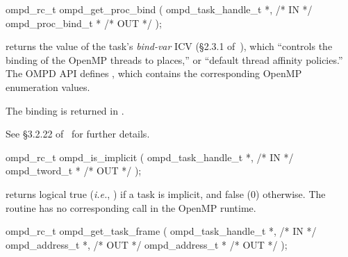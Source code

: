 \crossreferences


%
\summary

\format
\ccppspecificstart
\begin{boxedcode}
ompd\_rc\_t ompd\_get\_proc\_bind (
  ompd\_task\_handle\_t        *,                           /* IN */
  ompd\_proc\_bind\_t          *                                  /* OUT */
); 
\end{boxedcode}
\ccppspecificend

\descr
{} returns the value of the task's
\emph{bind-var} ICV (\S2.3.1 of~\cite{OpenMP}), which ``controls the
binding of the OpenMP threads to places,'' or ``default thread
affinity policies.''
%
The OMPD API defines
, which
contains the corresponding OpenMP enumeration values.
%

\argdesc
The binding is returned in .
%

\crossreferences
See \S3.2.22 of~\cite{OpenMP} for further details.

\summary

\format
\ccppspecificstart
\begin{boxedcode}
ompd\_rc\_t ompd\_is\_implicit (
  ompd\_task\_handle\_t  *,                                 /* IN */
  ompd\_tword\_t        *                                         /* OUT */
); 
\end{boxedcode}
\ccppspecificend

\descr
{} returns logical true (\textit{i.e.}, )
if a task is implicit, and false (0) otherwise.
The routine has no corresponding call in the OpenMP runtime.

\argdesc

\crossreferences



%
\summary

\format
\ccppspecificstart
\begin{boxedcode}
ompd\_rc\_t ompd\_get\_task\_frame (
  ompd\_task\_handle\_t        *,                           /* IN */
  ompd\_address\_t            *,                    /* OUT */
  ompd\_address\_t            *                  /* OUT */
);
\end{boxedcode}
\ccppspecificend

